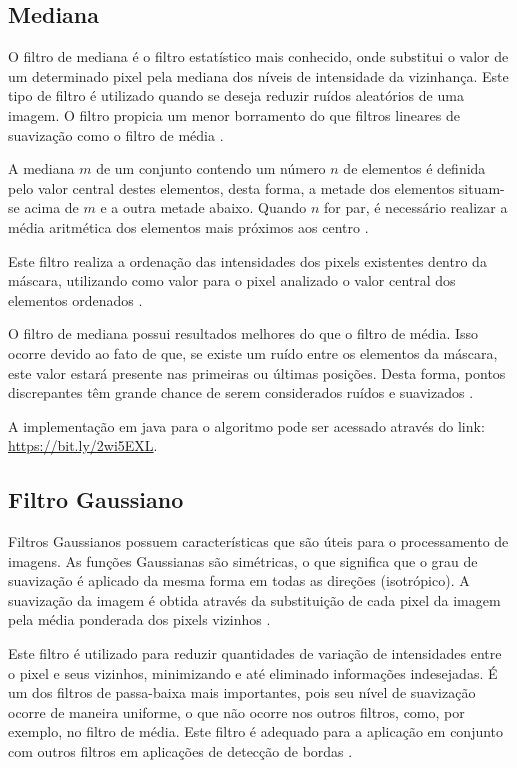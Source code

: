 \documentclass[
	12pt,				%
	oneside,			%
	a4paper,			%
	english,			%
	french,				%
	spanish,			%
	brazil,				%
	]{abntex2}
\begin{document}
\subsection{Mediana}

O filtro de mediana é o filtro estatístico mais conhecido, onde substitui o valor de um determinado pixel pela mediana dos níveis de intensidade da vizinhança. Este tipo de filtro é utilizado quando se deseja reduzir ruídos aleatórios de uma imagem. O filtro propicia um menor borramento do que filtros lineares de suavização como o filtro de média \cite{gonzalesWoods:2008}.

A mediana \(m\) de um conjunto contendo um número \(n\) de elementos é definida pelo valor central destes elementos, desta forma, a metade dos elementos situam-se acima de \(m\) e a outra metade abaixo. Quando \(n\) for par, é necessário realizar a média aritmética dos elementos mais próximos aos centro \cite{conciAzevedoLeta:2008}.

Este filtro realiza a ordenação das intensidades dos pixels existentes dentro da máscara, utilizando como valor para o pixel analizado o valor central dos elementos ordenados \cite{conciAzevedoLeta:2008}.

O filtro de mediana possui resultados melhores do que o filtro de média. Isso ocorre devido ao fato de que, se existe um ruído entre os elementos da máscara, este valor estará presente nas primeiras ou últimas posições. Desta forma, pontos discrepantes têm grande chance de serem considerados ruídos e suavizados \cite{conciAzevedoLeta:2008}.

A implementação em java para o algoritmo pode ser acessado através do link: \url{https://bit.ly/2wi5EXL}. 

\subsection{Filtro Gaussiano}
Filtros Gaussianos possuem características que são úteis para o processamento de imagens. As funções Gaussianas são simétricas, o que significa que o grau de suavização é aplicado da mesma forma em todas as direções (isotrópico). A suavização da imagem é obtida através da substituição de cada pixel da imagem pela média ponderada dos pixels vizinhos \cite{pedriniSchwartz:2008}. 

Este filtro é utilizado para reduzir quantidades de variação de intensidades entre o pixel e seus vizinhos, minimizando e até eliminado informações indesejadas. É um dos filtros de passa-baixa mais importantes, pois seu nível de suavização ocorre de maneira uniforme, o que não ocorre nos outros filtros, como, por exemplo, no filtro de média. Este filtro é adequado para a aplicação em conjunto com outros filtros em aplicações de detecção de bordas \cite{conciAzevedoLeta:2008}.   
\end{document}

